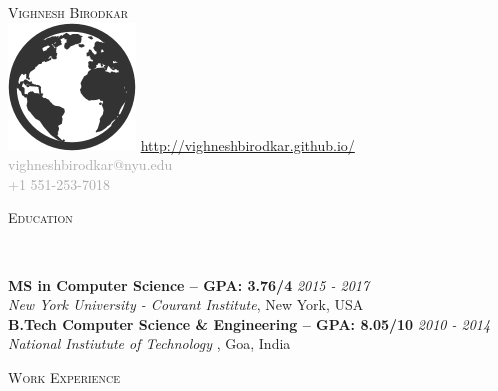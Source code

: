 \documentclass[9pt]{article}
\newenvironment{changemargin}[2]{%
  \begin{list}{}{%
    \setlength{\topsep}{0pt}%
    \setlength{\leftmargin}{#1}%
    \setlength{\rightmargin}{#2}%
    \setlength{\listparindent}{\parindent}%
    \setlength{\itemindent}{\parindent}%
    \setlength{\parsep}{\parskip}%
  }%
  \item[]}{\end{list}
}
\newcommand{\lineover}{
	\begin{changemargin}{-0.05in}{-0.05in}
		\vspace*{-8pt}
		\color{NavyBlue}
		\hrulefill \\
		\vspace*{-2pt}
	\end{changemargin}
}
\newcommand{\header}[1]{
	\begin{changemargin}{-0.5in}{-0.5in}
		\scshape{\textcolor{NavyBlue}{#1}}\\
  	\lineover
	\end{changemargin}
}
\newcommand{\contact}[4]{
	\begin{changemargin}{-0.5in}{-0.5in}
		\begin{center}
			{\Large \scshape \textcolor{NavyBlue}{#1}}\\ \smallskip
			\textcolor{DarkGray}{#3}\\ \smallskip
			\textcolor{DarkGray}{#4}\smallskip
		\end{center}
	\end{changemargin}
}
\newenvironment{body} {
	\vspace*{-16pt}
	\begin{changemargin}{-0.25in}{-0.5in}
  }	
	{\end{changemargin}
}
\begin{document}
\contact{Vighnesh Birodkar}{http://vighneshbirodkar.github.io/}{\includegraphics[height=1.6ex]{globe.png} \url{http://vighneshbirodkar.github.io/} \hspace{.01cm} \Letter \hspace{.01cm} vighneshbirodkar@nyu.edu }{\Mobilefone \hspace{.01cm} +1 551-253-7018}

\vspace{10pt}



\vspace{-1pt}
\header{Education}

\begin{body}
	\vspace{14pt}
	\textbf{MS in Computer Science -- GPA: 3.76/4 }{} \hfill \emph{2015 - 2017 }{} \\
	\emph{New York University - Courant Institute}, New York, USA{} \\
	\medskip	
	\textbf{B.Tech Computer Science \& Engineering -- GPA: 8.05/10}{} \hfill \emph{2010 - 2014 }{} \\
	\emph{National Instiutute of Technology }, Goa, India{} \\
\end{body}

\smallskip



\header{Work Experience}
\end{document}
